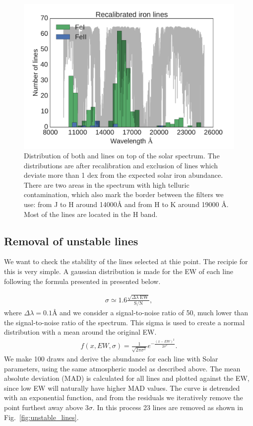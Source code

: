 \documentclass{aa}
\begin{document}
\begin{figure}[tpb]
    \centering
    \includegraphics[width=1.05\linewidth]{figures/EWvsEP_cut.pdf}
    \caption{Distribution of both  and  lines on top of the solar
    spectrum. The distributions are after recalibration and exclusion
    of lines which deviate more than 1 dex from the expected solar iron
    abundance. There are two areas in the spectrum with high telluric
    contamination, which also mark the border between the filters we
    use: from J to H around 14000\si{\angstrom} and from H to K around
    19000 \si{\angstrom}. Most of the lines are located in the H band.}
    \label{fig:Fe1_after_recal}
\end{figure}


\subsection{Removal of unstable lines}
\label{sub:removal_of_unstable_lines}

We want to check the stability of the lines selected at thie point. The
recipie for this is very simple. A gaussian distribution is made for the
EW of each line following the formula presented in \citet{Caryel1988}
presented below.

\begin{align}
    \sigma \simeq 1.6 \frac{\sqrt{\Delta\lambda\; \mathrm{EW}}}{\mathrm{S/N}},
\end{align}
where $\Delta\lambda=0.1\si{\angstrom}$ and we consider a
signal-to-noise ratio of 50, much lower than the signal-to-noise ratio
of the spectrum. This sigma is used to create a normal distribution with
a mean around the original EW.
\begin{align}
    f(x, EW, \sigma) = \frac{1}{\sqrt{2\pi\sigma^2}} e^{-\frac{(x-EW)^2}{2\sigma^2}}.
\end{align}
We make 100 draws and derive the abundance for each line with Solar
parameters, using the same atmospheric model as described above. The
mean absolute deviation (MAD) is calculated for all lines and plotted
against the EW, since low EW will naturally have higher MAD values. The
curve is detrended with an exponential function, and from the residuals
we iteratively remove the point furthest away above $3\sigma$. In this
process 23 lines are removed as shown in Fig.~\ref{fig:unstable_lines}.
\end{document}
